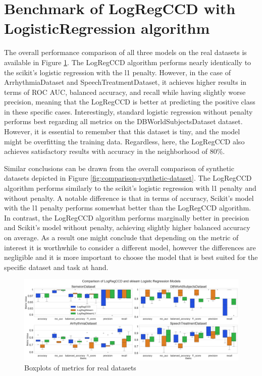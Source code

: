 \documentclass[11pt]{article}
\begin{document}
\section{Benchmark of LogRegCCD with LogisticRegression algorithm}

The overall performance comparison of all three models on the real datasets is available in Figure \ref{fig:real-data-boxplots}. The LogRegCCD algorithm performs nearly identically to the scikit's logistic regression with the l1 penalty. However, in the case of ArrhythmiaDataset and SpeechTreatmentDataset, it achieves higher results in terms of ROC AUC, balanced accuracy, and recall while having slightly worse precision, meaning that the LogRegCCD is better at predicting the positive class in these specific cases. Interestingly, standard logistic regression without penalty performs best regarding all metrics on the DBWorldSubjectsDataset dataset. However, it is essential to remember that this dataset is tiny, and the model might be overfitting the training data. Regardless, here, the LogRegCCD also achieves satisfactory results with accuracy in the neighborhood of 80\%. \par

Similar conclusions can be drawn from the overall comparison of synthetic datasets depicted in Figure \ref{fig:comparison-synthetic-dataset}. The LogRegCCD algorithm performs similarly to the scikit's logistic regression with l1 penalty and without penalty. A notable difference is that in terms of accuracy, Scikit's model with the l1 penalty performs somewhat better than the LogRegCCD algorithm. In contrast, the LogRegCCD algorithm performs marginally better in precision and Scikit's model without penalty, achieving slightly higher balanced accuracy on average. As a result one might conclude that depending on the metric of interest it is worthwhile to consider a different model, however the differences are negligible and it is more important to choose the model that is best suited for the specific dataset and task at hand. \par


\begin{figure}[h]
    \centering
  \includegraphics[width=\textwidth]{../results/real_data_boxplots.png}
    \caption{Boxplots of metrics for real datasets}
    \label{fig:real-data-boxplots}
  \end{figure}
\end{document}
